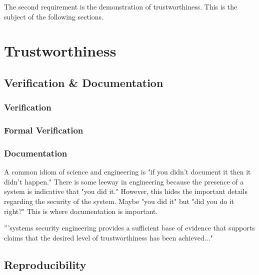 \documentclass[../../main/main.tex]{subfiles}
\begin{document}
The second requirement is the demonstration of trustworthiness.  This is the subject of the following sections.

\section{Trustworthiness}\label{sssec:trustworthiness}

\subsection{Verification \& Documentation}\label{sssec:sseframework}

\subsubsection{Verification}
\subsubsection{Formal Verification}

\subsubsection{Documentation}


A common idiom of science and engineering is "if you didn't document it then it didn't happen."  There is some leeway in engineering because the presence of a system is indicative that "you did it." However, this hides the important details regarding the security of the system.  Maybe "you did it" but "did you do it right?"  This is where documentation is important. 

'''systems security engineering provides a sufficient base of evidence that supports claims that the desired level of trustworthiness has been achieved..."

\subsection{Reproducibility}\label{ssec:reproducibility}
\end{document}
